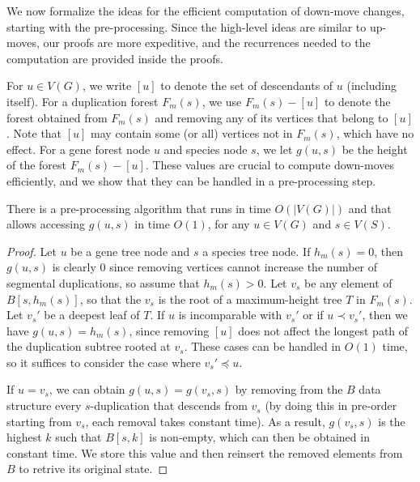 \documentclass[10pt]{article}
\begin{document}
\begin{toappendix}
We now formalize the ideas for the efficient computation of down-move changes, starting with the pre-processing.  Since the high-level ideas are similar to up-moves, our proofs are more expeditive, and the recurrences needed to the computation are provided inside the proofs.

For $u \in V(G)$, we write $[u]$ to denote the set of descendants of $u$ (including itself).
For a duplication forest $F_m(s)$, we use $F_m(s) - [u]$ to denote the forest obtained from $F_m(s)$ 
and removing any of its vertices that belong to $[u]$.  Note that $[u]$ may contain some (or all) vertices not in $F_m(s)$, which have no effect.
For a gene forest node $u$ and species node $s$, we let $g(u, s)$ be the height of the forest $F_m(s) - [u]$.
These values are crucial to compute down-moves efficiently, and we show that they can be handled in a pre-processing step.

\begin{lemma}
There is a pre-processing algorithm that runs in time $O(|V(G)|)$ and that allows accessing $g(u, s)$ in time $O(1)$, 
for any $u \in V(G)$ and $s \in V(S)$.
\end{lemma}

\begin{proof}
Let $u$ be a gene tree node and $s$ a species tree node.
If $h_m(s) = 0$, then $g(u, s)$ is clearly $0$ since removing vertices cannot increase the number of segmental duplications, so assume that $h_m(s) > 0$.
Let $v_s$ be any element of $B[s, h_m(s)]$, so that the $v_s$ is the root of a maximum-height tree $T$ in $F_m(s)$.  
Let $v_s'$ be a deepest leaf of $T$.  
If $u$ is incomparable with $v_s'$ or if $u \prec v_s'$, then we have $g(u, s) = h_m(s)$, since removing $[u]$ does not affect the longest path of the duplication subtree rooted at $v_s$.  
These cases can be handled in $O(1)$ time, so it suffices to consider the case where $v_s' \preceq u$.  

If $u = v_s$, we can obtain $g(u, s) = g(v_s, s)$ by removing from the $B$ data structure every $s$-duplication that descends from $v_s$ (by doing this in pre-order starting from $v_s$, each removal takes constant time).  As a result, $g(v_s, s)$ is the highest $k$ such that $B[s, k]$ is non-empty, which can then be obtained in constant time.  We store this value and then reinsert the removed elements from $B$ to retrive its original state.


\end{proof}
\end{toappendix}
\end{document}
